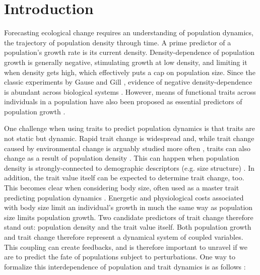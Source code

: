 \documentclass{article}
\begin{document}

\pagebreak

\setlength{\parindent}{0.5cm} %

\section{Introduction}

Forecasting ecological change requires an understanding of population dynamics, the trajectory of population density through time. A prime predictor of a population's growth rate is its current density. Density-dependence of population growth is generally negative, stimulating growth at low density, and limiting it when density gets high, which effectively puts a cap on population size. Since the classic experiments by Gause \cite{Gause1934} and Gill \cite{Gill1972}, evidence of negative density-dependence is abundant across biological systems \cite{Sibly2005}. However, means of functional traits across individuals in a population have also been proposed as essential predictors of population growth \cite{Ozgul2012,Edwards2013,Perez-Ramos2019,Litchman2008,Violle2007a}.

One challenge when using traits to predict population dynamics is that traits are not static but dynamic. Rapid trait change is widespread \cite{Ellner2011} and, while trait change caused by environmental change is arguably studied more often \cite{Grainger2021}, traits can also change as a result of population density \cite{Gibert2022}. This can happen when population density is strongly-connected to demographic descriptors (e.g. size structure) \cite{Gillooly2001,Brown2004,DeLong2015,Wieczynski2021}. In addition, the trait value itself can be expected to determine trait change, too. This becomes clear when considering body size, often used as a master trait predicting population dynamics \cite{Litchman2008}. Energetic and physiological costs associated with body size limit an individual's growth \cite{Frank2009,Schmidt-Nielsen1984,Haldane1926} in much the same way as population size limits population growth. Two candidate predictors of trait change therefore stand out: population density and the trait value itself. Both population growth and trait change therefore represent a dynamical system of coupled variables. This coupling can create feedbacks, and is therefore important to unravel if we are to predict the fate of populations subject to perturbations. One way to formalize this interdependence of population and trait dynamics is as follows \cite{Patel2018}: 
\end{document}
